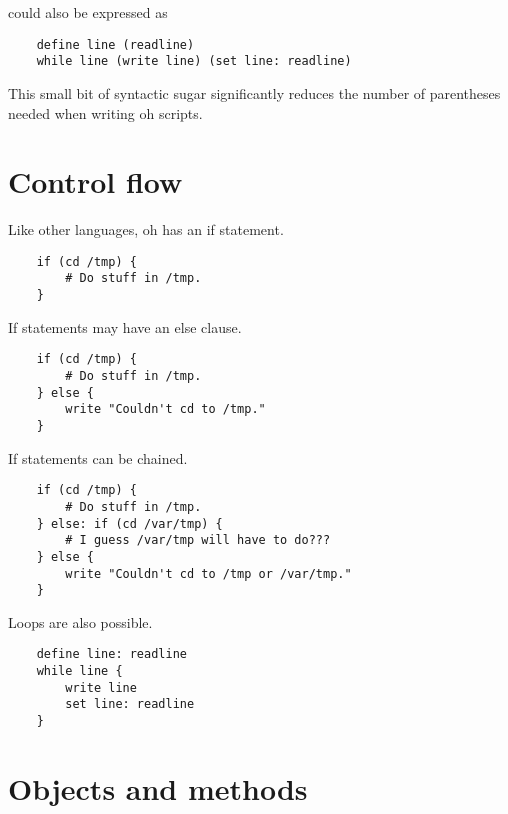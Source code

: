 \documentclass[12pt]{book}
\begin{document}
could also be expressed as

\begin{lstlisting}
	define line (readline)
	while line (write line) (set line: readline)
\end{lstlisting}

This small bit of syntactic sugar significantly reduces the number of
parentheses needed when writing oh scripts.


\section{Control flow}

Like other languages, oh has an if statement.

\begin{lstlisting}
	if (cd /tmp) {
		# Do stuff in /tmp.
	}
\end{lstlisting}

If statements may have an else clause.

\begin{lstlisting}
	if (cd /tmp) {
		# Do stuff in /tmp.
	} else {
		write "Couldn't cd to /tmp."
	}
\end{lstlisting}

If statements can be chained.

\begin{lstlisting}
	if (cd /tmp) {
		# Do stuff in /tmp.
	} else: if (cd /var/tmp) {
		# I guess /var/tmp will have to do???
	} else {
		write "Couldn't cd to /tmp or /var/tmp."
	}
\end{lstlisting}

Loops are also possible.

\begin{lstlisting}
	define line: readline
	while line {
		write line
		set line: readline
	}
\end{lstlisting}

\section{Objects and methods}




\end{document}
